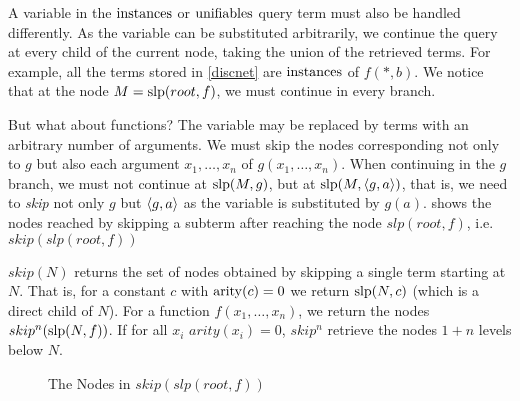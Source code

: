 A variable in the $\mathrm{instances}$ or $\mathrm{unifiables}$ query term must also be handled differently. As the variable can be substituted arbitrarily, we continue the query at every child of the current node, taking the union of the retrieved terms. For example, all the terms stored in \cref{discnet} are $\mathrm{instances}$ of $f(*,b)$. We notice that at the node $M = \mathrm{slp}(root,f)$, we must continue in every branch.

But what about functions? The variable may be replaced by terms with an arbitrary number of arguments. We must skip the nodes corresponding not only to $g$ but also each argument $x_{1}, \dots, x_{n}$ of $g(x_{1},\dots,x_{n})$. When continuing in the $g$ branch, we must not continue at $\mathrm{slp}(M,g)$, but at $\mathrm{slp}(M,\langle g,a \rangle)$, that is, we need to \emph{skip} not only $g$ but $\langle g, a \rangle$ as the variable is substituted by $g(a)$.  shows the nodes reached by skipping a subterm after reaching the node $slp(root,f)$, i.e. $skip(slp(root,f))$

\begin{defn}
  $skip(N)$ returns the set of nodes obtained by skipping a single term starting at $N$. That is, for a constant $c$ with $\mathrm{arity}(c) = 0$ we return $\mathrm{slp}(N,c)$ (which is a direct child of $N$). For a function $f(x_{1},\dots,x_{n})$, we return the nodes $skip^n(\mathrm{slp}(N,f))$. If for all $x_{i}$ $arity(x_{i}) = 0$, $skip^n$ retrieve the nodes $1 + n$ levels below $N$.
\end{defn}

\begin{figure}[h]
  \centering
{}
  \caption{The Nodes in $skip(slp(root,f))$} \label{discnetskip}
\end{figure}

